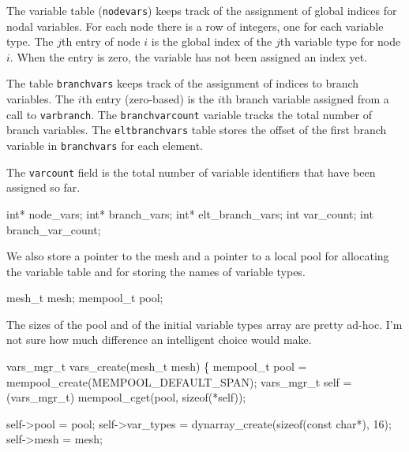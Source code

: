 The variable table ({\tt{}node{}vars}) keeps track of the assignment of
global indices for nodal variables.  For each node there is a row of
integers, one for each variable type.  The $j$th entry of node $i$
is the global index of the $j$th variable type for node $i$.  When
the entry is zero, the variable has not been assigned an index yet.

The table {\tt{}branch{}vars} keeps track of the assignment of indices
to branch variables.  The $i$th entry (zero-based) is the $i$th
branch variable assigned from a call to {\tt{}var{}branch}.
The {\tt{}branch{}var{}count} variable tracks the total number of branch
variables.  The {\tt{}elt{}branch{}vars} table stores the offset of the
first branch variable in {\tt{}branch{}vars} for each element.

The {\tt{}var{}count} field is the total number of variable identifiers that
have been assigned so far.

\nwenddocs{}\plusendmoddef
int* node_vars;
int* branch_vars;
int* elt_branch_vars;
int var_count;
int branch_var_count;
\nwendcode{}\nwdocspar

We also store a pointer to the mesh and a pointer to a local pool
for allocating the variable table and for storing the names of variable
types.

\nwenddocs{}\plusendmoddef
mesh_t mesh;
mempool_t pool;
\nwendcode{}\nwdocspar

The sizes of the pool and of the initial variable types array are
pretty ad-hoc.  I'm not sure how much difference an intelligent %
choice would make.

\nwenddocs{}\endmoddef
vars_mgr_t vars_create(mesh_t mesh)
\{
    mempool_t pool = mempool_create(MEMPOOL_DEFAULT_SPAN);
    vars_mgr_t self = (vars_mgr_t) mempool_cget(pool, sizeof(*self));

    self->pool = pool;
    self->var_types = dynarray_create(sizeof(const char*), 16);
    self->mesh = mesh;

